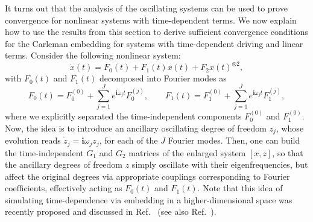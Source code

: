 \documentclass[superscriptaddress,onecolumn,nofootinbib,longbibliography,a4paper,accepted=2026-09-29]{quantumarticle}
\theoremstyle{plain}
\theoremstyle{definition}
\numberwithin{thm}{section}
\numberwithin{assumption}{section}
\numberwithin{lemma}{section}
\numberwithin{prop}{section}
\numberwithin{cor}{section}
\numberwithin{definition}{section}
\numberwithin{rmk}{section}
\numberwithin{equation}{section}
\newcommand{\ot}{\otimes}
\renewcommand{\i}{\ensuremath{\mathbf{i}}}
\begin{document}
It turns out that the analysis of the oscillating systems can be used to prove convergence for nonlinear systems with time-dependent terms. We now explain how to use the results from this section to derive sufficient convergence conditions for the Carleman embedding for systems with time-dependent driving and linear terms. Consider the following nonlinear system:
\begin{equation}
     \dot{x}(t) = F_0(t) + F_1(t) x(t) + F_2 x(t)^{\ot 2},
\end{equation}
with $F_0(t)$ and $F_1(t)$ decomposed into Fourier modes as
\begin{equation}
    F_0(t) = F_0^{(0)} + \sum_{j=1}^J e^{\i \omega_j t} F_0^{(j)} ,\qquad F_1(t) = F_1^{(0)} +  \sum_{j=1}^J e^{\i \omega_j t} F_1^{(j)},
\end{equation}
where we explicitly separated the time-independent components $F_0^{(0)}$ and $F_1^{(0)}$. Now, the idea is to introduce an ancillary oscillating degree of freedom $z_j$, whose evolution reads $\dot{z}_j=\i\omega_j z_j$, for each of the $J$ Fourier modes. Then, one can build the time-independent $G_1$ and $G_2$ matrices of the enlarged system $[x,z]$, so that the ancillary degrees of freedom $z$ simply oscillate with their eigenfrequencies, but affect the original degrees via appropriate couplings corresponding to Fourier coefficients, effectively acting as $F_0(t)$ and $F_1(t)$. Note that this idea of simulating time-dependence via embedding in a higher-dimensional space was recently proposed and discussed in Ref.~\cite{muraleedharan2025simulating} (see also Ref.~\cite{chen2024carleman}).
\end{document}
